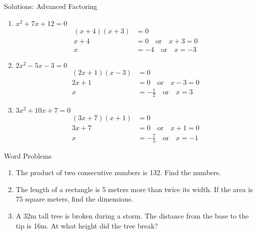 \documentclass[aspectratio=169]{beamer}
\begin{document}
\begin{frame}{Solutions: Advanced Factoring}
    \begin{tcolorbox}[colback=lightgray,colframe=accent,title=Detailed Solutions]
        \footnotesize
        \begin{enumerate}
            \setlength{\itemsep}{0.5em}
            \item $x^2 + 7x + 12 = 0$
            \begin{align*}
                (x + 4)(x + 3) &= 0 \\
                x + 4 &= 0 \quad \text{or} \quad x + 3 = 0 \\
                x &= -4 \quad \text{or} \quad x = -3
            \end{align*}
            
            \item $2x^2 - 5x - 3 = 0$
            \begin{align*}
                (2x + 1)(x - 3) &= 0 \\
                2x + 1 &= 0 \quad \text{or} \quad x - 3 = 0 \\
                x &= -\frac{1}{2} \quad \text{or} \quad x = 3
            \end{align*}
            
            \item $3x^2 + 10x + 7 = 0$
            \begin{align*}
                (3x + 7)(x + 1) &= 0 \\
                3x + 7 &= 0 \quad \text{or} \quad x + 1 = 0 \\
                x &= -\frac{7}{3} \quad \text{or} \quad x = -1
            \end{align*}
        \end{enumerate}
    \end{tcolorbox}
\end{frame}

\begin{frame}{Word Problems}
    \begin{tcolorbox}[colback=lightgray,colframe=primary,title=Solve Each of the Following]
        \footnotesize
        \begin{enumerate}
            \setlength{\itemsep}{0.5em}
            \item The product of two consecutive numbers is 132. Find the numbers.
            
            \item The length of a rectangle is 5 meters more than twice its width. If the area is 75 square meters, find the dimensions.
            
            \item A 32m tall tree is broken during a storm. The distance from the base to the tip is 16m. At what height did the tree break?
        \end{enumerate}
    \end{tcolorbox}
\end{frame}
\end{document}
